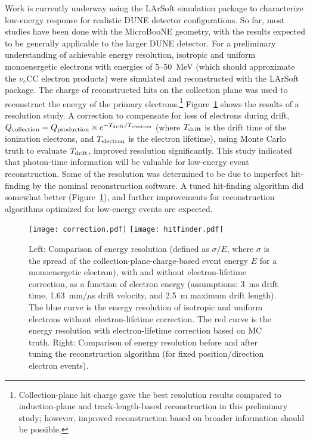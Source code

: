 Work is currently underway using the LArSoft simulation package to
characterize low-energy response for realistic DUNE detector
configurations.
So far, most studies have been done with the MicroBooNE geometry, with
the results expected to be generally applicable to the larger DUNE
detector.  For a preliminary understanding of achievable energy
resolution, isotropic and uniform monoenergetic electrons with
energies of 5--50~MeV (which should approximate the $\nu_e$CC
electron products) were simulated and reconstructed with the LArSoft
package.  The charge of reconstructed hits on the collection plane was
used to reconstruct the energy of the primary electrons.\footnote{Collection-plane hit charge gave the best resolution results
  compared to induction-plane and track-length-based reconstruction in
  this preliminary study; however, improved reconstruction based on
  broader information should be possible.}
Figure~\ref{fig:lowe_res} shows the results of a resolution study.  
A correction to compensate for loss of electrons during
drift, $Q_{\rm collection}=Q_{\rm production}\times e^{-T_{\rm drift} / T_{\rm
    electron}}$ (where $T_{\rm drift}$ is the drift time of the ionization
electrons, and $T_{\rm electron}$ is the electron lifetime), using Monte
Carlo truth to evaluate $T_{\rm drift}$, improved resolution
significantly.  This study indicated that photon-time information will
be valuable for low-energy event reconstruction.  Some of the
resolution was determined to be due to imperfect hit-finding by the
nominal reconstruction software.  A tuned hit-finding algorithm did
somewhat better (Figure~\ref{fig:lowe_res}), and further improvements
for reconstruction algorithms optimized for low-energy events are
expected.
\begin{figure}[!htb] %
 \centering
\texttt{[image: correction.pdf]} 
\texttt{[image: hitfinder.pdf]} 
 \caption[Comparisons of energy resolution]{Left: Comparison of energy
   resolution (defined as $\sigma/E$, where $\sigma$ is the spread of
   the collection-plane-charge-based event energy $E$ for a
   monoenergetic electron), with and without electron-lifetime
   correction, as a function of electron energy (assumptions: 3~ms
   drift time, 1.63~mm/$\mu$s drift velocity, and 2.5~m maximum drift
   length). The blue curve is the energy resolution of isotropic and
   uniform electrons without electron-lifetime correction. The red
   curve is the energy resolution with electron-lifetime correction
   based on MC truth.  Right: Comparison of energy resolution before
   and after tuning the reconstruction algorithm (for fixed
   position/direction electron events).}\label{fig:lowe_res}
\end{figure}

